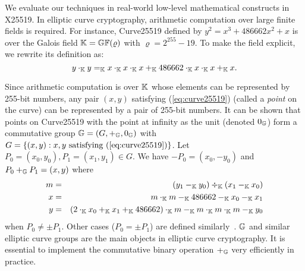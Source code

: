 
We evaluate our techniques in real-world low-level mathematical
constructs in X25519. 
In elliptic curve cryptography, arithmetic computation over
large finite fields is required. For
instance, Curve25519 defined by $y^2 = x^3 + 486662 x^2 + x$ 
is over the Galois field $\mathbb{K} = \mathbb{GF}(\varrho)$ with
$\varrho = 2^{255} - 19$. To
make the field explicit, we rewrite its definition as:
\begin{equation}
  \label{eq:curve25519}
  y \cdot_{\mathbb{K}} y =_{\mathbb{K}} x \cdot_{\mathbb{K}} x \cdot_{\mathbb{K}} x +_{\mathbb{K}}
  486662 \cdot_{\mathbb{K}} x \cdot_{\mathbb{K}} x +_{\mathbb{K}} x.
\end{equation}

Since arithmetic computation is over $\mathbb{K}$ whose
elements can be represented by 255-bit numbers,
any pair $(x, y)$ satisfying (\ref{eq:curve25519}) (called a
\emph{point} on the curve) can be represented by a pair of 255-bit
numbers. It can be shown that points on Curve25519 with the point at
infinity as the unit (denoted $0_{\mathbb{G}}$) form a commutative group $\mathbb{G} = (G, +_{\mathbb{G}}, 0_{\mathbb{G}})$
with $G = \{ (x, y) : x, y \textmd{ satisfying } (\ref{eq:curve25519})
\}$. Let $P_0 = (x_0, y_0), P_1 = (x_1, y_1) \in G$. We have $-P_0 =
(x_0, -y_0)$ and $P_0 +_{\mathbb{G}} P_1 = (x, y)$  where
\begin{eqnarray}
  m & = & (y_1 \Fminus y_0) \Fdiv (x_1 \Fminus x_0)\\\nonumber
  x & = & m \Ftimes m \Fminus 486662 \Fminus x_0 \Fminus x_1\\ \nonumber
  y & = & %
          (2 \Ftimes x_0 \Fplus x_1 \Fplus 486662 )\Ftimes m
          \Fminus m \Ftimes m \Ftimes m\Fminus y_0
  \label{eq:curve25519-group}
\end{eqnarray}
when $P_0 \neq \pm P_1$. Other cases ($P_0 = \pm P_1$) are defined
similarly~\cite{C:96:CCANT}.
$\mathbb{G}$ and similar elliptic curve groups
are the main objects in elliptic curve cryptography. It is
essential to implement the commutative binary operation $+_{\mathbb{G}}$ very
efficiently in practice.

